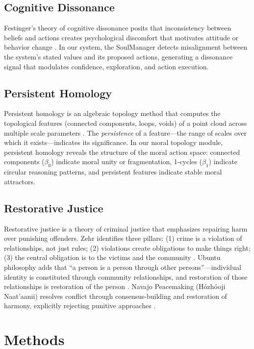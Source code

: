 \documentclass[11pt,a4paper]{article}
\begin{document}
\subsection{Cognitive Dissonance}

Festinger's theory of cognitive dissonance posits that inconsistency between beliefs and actions creates psychological discomfort that motivates attitude or behavior change \citep{festinger1957}. In our system, the SoulManager detects misalignment between the system's stated values and its proposed actions, generating a dissonance signal that modulates confidence, exploration, and action execution.

\subsection{Persistent Homology}

Persistent homology is an algebraic topology method that computes the topological features (connected components, loops, voids) of a point cloud across multiple scale parameters \citep{carlsson2009}. The \emph{persistence} of a feature---the range of scales over which it exists---indicates its significance. In our moral topology module, persistent homology reveals the structure of the moral action space: connected components ($\beta_0$) indicate moral unity or fragmentation, 1-cycles ($\beta_1$) indicate circular reasoning patterns, and persistent features indicate stable moral attractors.

\subsection{Restorative Justice}

Restorative justice is a theory of criminal justice that emphasizes repairing harm over punishing offenders. Zehr identifies three pillars: (1) crime is a violation of relationships, not just rules; (2) violations create obligations to make things right; (3) the central obligation is to the victims and the community \citep{zehr2002}. Ubuntu philosophy adds that ``a person is a person through other persons''---individual identity is constituted through community relationships, and restoration of those relationships is restoration of the person \citep{tutu1999}. Navajo Peacemaking (H\'{o}zh\'{o}oji Naat'aanii) resolves conflict through consensus-building and restoration of harmony, explicitly rejecting punitive approaches \citep{yazzie1994}.

\section{Methods}
\end{document}

